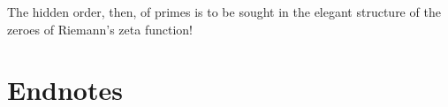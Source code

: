 \documentclass[11pt]{article}
\theoremstyle{plain}
\theoremstyle{definition}
\numberwithin{equation}{section}
\numberwithin{figure}{section}
\numberwithin{table}{section}
\begin{document}
The hidden order, then, of primes is to be sought in the elegant
structure of the zeroes of Riemann's zeta function!



\bigskip



\newpage
\section{Endnotes}


\theendnotes

\label{lastpage}
\end{document}
